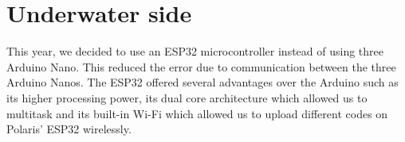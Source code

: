 \documentclass[a4paper,10pt]{article}
\begin{document}
	\section{Underwater side}
		This year, we decided to use an ESP32 microcontroller instead of using three Arduino Nano. 
		This reduced the error due to communication between the three Arduino Nanos. The ESP32 
		offered several advantages over the Arduino such as its higher processing power, its dual core 
		architecture which allowed us to multitask and its built-in Wi-Fi which allowed us to upload 
		different codes on Polaris’ ESP32 wirelessly.
	
	
\end{document}
